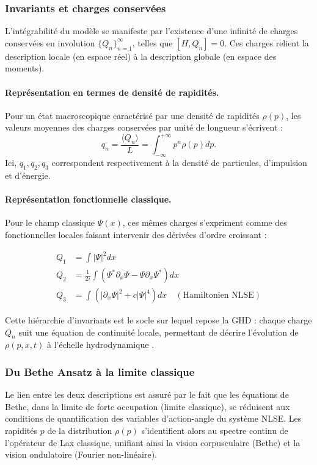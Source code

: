 \subsubsection{Invariants et charges conservées}

L'intégrabilité du modèle se manifeste par l'existence d'une infinité de charges conservées en involution $\{Q_n\}_{n=1}^{\infty}$, telles que $[H, Q_n] = 0$. Ces charges relient la description locale (en espace réel) à la description globale (en espace des moments).\paragraph{Représentation en termes de densité de rapidités.} Pour un état macroscopique caractérisé par une densité de rapidités $\rho(p)$, les valeurs moyennes des charges conservées par unité de longueur s'écrivent :\begin{equation}q_n = \frac{\langle Q_n \rangle}{L} = \int_{-\infty}^{+\infty} p^n \rho(p) dp.\end{equation}Ici, $q_1, q_2, q_3$ correspondent respectivement à la densité de particules, d'impulsion et d'énergie.\paragraph{Représentation fonctionnelle classique.} Pour le champ classique $\Psi(x)$, ces mêmes charges s'expriment comme des fonctionnelles locales faisant intervenir des dérivées d'ordre croissant :

\begin{align}Q_1 &= \int |\Psi|^2 dx \\ Q_2 &= \frac{1}{2i} \int (\Psi^* \partial_x \Psi - \Psi \partial_x \Psi^*) dx\\ Q_3 &= \int \left( |\partial_x \Psi|^2 + c |\Psi|^4 \right) dx \quad (\text{Hamiltonien NLSE})\end{align}

Cette hiérarchie d'invariants est le socle sur lequel repose la GHD : chaque charge $Q_n$ suit une équation de continuité locale, permettant de décrire l'évolution de $\rho(p, x, t)$ à l'échelle hydrodynamique \cite{Korepin_1997, Faddeev1987}.
 
\subsubsection{Du Bethe Ansatz à la limite classique}

Le lien entre les deux descriptions est assuré par le fait que les équations de Bethe, dans la limite de forte occupation (limite classique), se réduisent aux conditions de quantification des variables d'action-angle du système NLSE. Les rapidités $p$ de la distribution $\rho(p)$ s'identifient alors au spectre continu de l'opérateur de Lax classique, unifiant ainsi la vision corpusculaire (Bethe) et la vision ondulatoire (Fourier non-linéaire).


